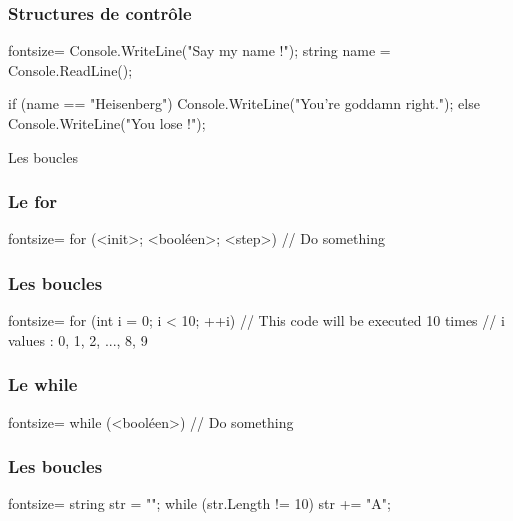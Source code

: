 \begin{frame}[fragile]
  \frametitle{Structures de contrôle}

  \begin{csharpcode*}{fontsize=\scriptsize}
    Console.WriteLine("Say my name !");
    string name = Console.ReadLine();

    if (name == "Heisenberg")
    {
      Console.WriteLine("You're goddamn right.");
    }
    else
    {
      Console.WriteLine("You lose !");
    }
  \end{csharpcode*}
\end{frame}

\begin{frame}
  \begin{center}
    \vspace{1cm}
    Les boucles
  \end{center}
\end{frame}

\begin{frame}[fragile]
  \frametitle{Le for}

  \begin{csharpcode*}{fontsize=\scriptsize}
    for (<init>; <booléen>; <step>)
    {
      // Do something
    }
  \end{csharpcode*}
\end{frame}

\begin{frame}[fragile]
  \frametitle{Les boucles}

  \begin{csharpcode*}{fontsize=\scriptsize}
    for (int i = 0; i < 10; ++i)
    {
      // This code will be executed 10 times
      // i values : 0, 1, 2, ..., 8, 9
    }
  \end{csharpcode*}
\end{frame}

\begin{frame}[fragile]
  \frametitle{Le while}

  \begin{csharpcode*}{fontsize=\scriptsize}
    while (<booléen>)
    {
      // Do something
    }
  \end{csharpcode*}
\end{frame}

\begin{frame}[fragile]
  \frametitle{Les boucles}

  \begin{csharpcode*}{fontsize=\scriptsize}
    string str = "";
    while (str.Length != 10)
    {
      str += "A";
    }
  \end{csharpcode*}
\end{frame}

